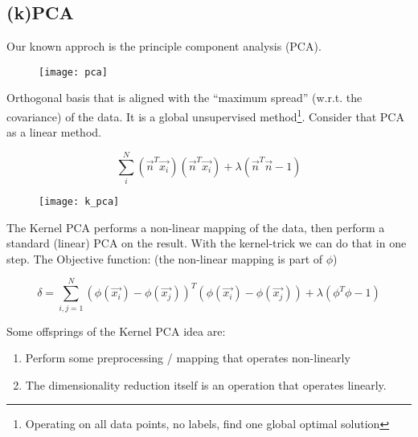 
\subsection*{(k)PCA}

Our known approch is the principle component analysis (PCA).

\begin{figure}[H]
	\centering
	\texttt{[image: pca]}
\end{figure}

Orthogonal basis that is aligned with the ``maximum spread'' (w.r.t. the covariance) of the data. It is a global unsupervised method\footnote{Operating on all data points, no labels, find one global optimal solution}. Consider that PCA as a linear method.

\begin{equation*}
    \sum_{i}^{N} (\vec{n}^T \vec{x_i}) (\vec{n}^T \vec{x_i}) + \lambda (\vec{n}^T \vec{n} - 1)
\end{equation*}

\begin{figure}[H]
	\centering
	\texttt{[image: k\_pca]}
\end{figure}

The Kernel PCA performs a non-linear mapping of the data, then perform a standard (linear) PCA on the result. With the kernel-trick we can do that in one step. The Objective function: (the non-linear mapping is part of $\phi$)


\begin{equation*}
    \delta = \sum_{i,j=1}^{N} (\phi(\vec{x_i}) - \phi(\vec{x_j}))^T (\phi(\vec{x_i}) - \phi(\vec{x_j})) + \lambda (\phi^T\phi-1)
\end{equation*}

Some offsprings of the Kernel PCA idea are:
\begin{enumerate}
    \item Perform some preprocessing / mapping that operates non-linearly
    \item The dimensionality reduction itself is an operation that operates linearly.
\end{enumerate}
